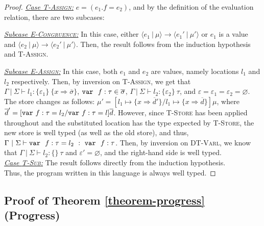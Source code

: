 \begin{proof}
\noindent\underline{\textit{Case \textsc{T-Assign}:}}
$e = (e_1.f = e_2)$, and by the definition of the evaluation relation, there are two subcases:

\underline{\textit{Subcase \textsc{E-Congruence}:}} In this case, either $\langle e_1~|~\mu \rangle \longrightarrow \langle e_1'~|~\mu' \rangle$ or $e_1$ is a value and \mbox{$\langle e_2~|~\mu \rangle \longrightarrow \langle e_2'~|~\mu' \rangle$}. Then, the result follows from the induction hypothesis and \textsc{T-Assign}.

\underline{\textit{Subcase \textsc{E-Assign}:}} In this case, both $e_1$ and $e_2$ are values, namely locations $l_1$ and $l_2$ respectively. Then, by inversion on \textsc{T-Assign}, we get that \mbox{$\Gamma~|~\Sigma \vdash l_1 : \{ \varepsilon_1 \}~\{ x \Rightarrow \overline{\sigma} \}$}, \mbox{$\mathtt{var}~~ f : \tau \in \overline{\sigma}$}, \mbox{$\Gamma~|~\Sigma \vdash l_2 : \{ \varepsilon_2 \}~\tau$}, and \mbox{$\varepsilon = \varepsilon_1 = \varepsilon_2 = \varnothing$}. The store changes as follows:\linebreak
\mbox{$\mu' = [l_1 \mapsto \{ x \Rightarrow \overline{d}' \}/l_1 \mapsto \{ x \Rightarrow \overline{d} \}]\mu$}, where $\overline{d}' = [\mathtt{var}~ f:\tau = l_2/\mathtt{var}~ f : \tau = l]\overline{d}$. However, since \textsc{T-Store} has been applied throughout and the substituted location has the type expected by \textsc{T-Store}, the new store is well typed (as well as the old store), and thus,\linebreak
\mbox{$\Gamma~|~\Sigma \vdash \mathtt{var}~~ f : \tau = l_2~:~\mathtt{var}~~ f : \tau$}. Then, by inversion on \textsc{DT-Varl}, we know that\linebreak
\mbox{$\Gamma~|~\Sigma \vdash l_2 : \{ \}~\tau$} and $\varepsilon' = \varnothing$, and the right-hand side is well typed.
\\

\noindent\underline{\textit{Case \textsc{T-Sub}:}}
The result follows directly from the induction hypothesis.
\\

\noindent Thus, the program written in this language is always well typed.
\end{proof}



\subsection{Proof of Theorem \ref{theorem-progress} (Progress)}
\label{app-progress}


